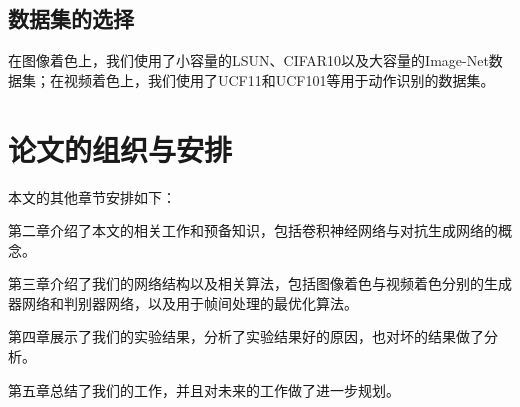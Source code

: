 \subsection{数据集的选择}
\label{sec:dataset}

  在图像着色上，我们使用了小容量的LSUN、CIFAR10以及大容量的Image-Net数据集；在视频着色上，我们使用了UCF11和UCF101等用于动作识别的数据集。

\section{论文的组织与安排}
\label{sec:org}

  本文的其他章节安排如下：

  第二章介绍了本文的相关工作和预备知识，包括卷积神经网络与对抗生成网络的概念。

  第三章介绍了我们的网络结构以及相关算法，包括图像着色与视频着色分别的生成器网络和判别器网络，以及用于帧间处理的最优化算法。

  第四章展示了我们的实验结果，分析了实验结果好的原因，也对坏的结果做了分析。

  第五章总结了我们的工作，并且对未来的工作做了进一步规划。